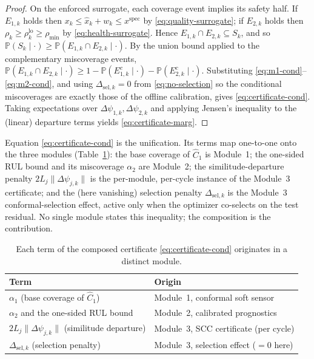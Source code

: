 \begin{proof}
On the enforced surrogate, each coverage event implies its safety half. If
$E_{1,k}$ holds then $x_k \le \hat x_k + w_k \le x^{\mathrm{spec}}$ by
\eqref{eq:quality-surrogate}; if $E_{2,k}$ holds then
$\rho_k \ge \rho_k^{\mathrm{lo}} \ge \rho_{\min}$ by \eqref{eq:health-surrogate}.
Hence $E_{1,k}\cap E_{2,k} \subseteq S_k$, and so
$\mathbb{P}(S_k \mid \cdot) \ge \mathbb{P}(E_{1,k}\cap E_{2,k}\mid\cdot)$.
By the union bound applied to the complementary miscoverage events,
$\mathbb{P}(E_{1,k}\cap E_{2,k}\mid\cdot) \ge 1 - \mathbb{P}(E_{1,k}^c\mid\cdot)
- \mathbb{P}(E_{2,k}^c\mid\cdot)$. Substituting
\eqref{eq:m1-cond}--\eqref{eq:m2-cond}, and using
$\Delta_{\mathrm{sel},k}=0$ from \eqref{eq:no-selection} so the conditional
miscoverages are exactly those of the offline calibration, gives
\eqref{eq:certificate-cond}. Taking expectations over $\Delta\psi_{1,k},
\Delta\psi_{2,k}$ and applying Jensen's inequality to the (linear) departure terms
yields \eqref{eq:certificate-marg}.
\end{proof}

Equation \eqref{eq:certificate-cond} is the unification. Its terms map one-to-one
onto the three modules (Table~\ref{tab:terms}): the base coverage of $\hat C_1$ is
Module~1; the one-sided RUL bound and its miscoverage $\alpha_2$ are Module~2; the
similitude-departure penalty $2L_j\|\Delta\psi_{j,k}\|$ is the per-module,
per-cycle instance of the Module~3 certificate; and the (here vanishing) selection
penalty $\Delta_{\mathrm{sel},k}$ is the Module~3 conformal-selection effect, active
only when the optimizer co-selects on the test residual. No single module states
this inequality; the composition is the contribution.

\begin{table}[t]
\centering
\caption{Each term of the composed certificate \eqref{eq:certificate-cond}
originates in a distinct module.}
\label{tab:terms}
\begin{tabular}{ll}
\toprule
Term & Origin \\
\midrule
$\alpha_1$ (base coverage of $\hat C_1$) & Module~1, conformal soft sensor \\
$\alpha_2$ and the one-sided RUL bound & Module~2, calibrated prognostics \\
$2L_j\|\Delta\psi_{j,k}\|$ (similitude departure) & Module~3, SCC certificate (per cycle) \\
$\Delta_{\mathrm{sel},k}$ (selection penalty) & Module~3, selection effect ($=0$ here) \\
\bottomrule
\end{tabular}
\end{table}

